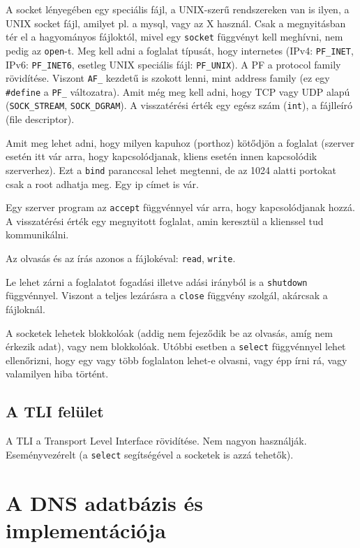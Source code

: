 \documentclass[fleqn,10pt,a4paper]{article}
\theoremstyle{magyar}
\begin{document}
  A socket lényegében egy speciális fájl, a UNIX-szerű rendszereken van is ilyen, a UNIX socket fájl, amilyet pl. a
  mysql, vagy az X használ. Csak a megnyitásban tér el a hagyományos fájloktól, mivel egy \texttt{socket} függvényt kell
  meghívni, nem pedig az \texttt{open}-t. Meg kell adni a foglalat típusát, hogy internetes (IPv4: \texttt{PF\_INET},
  IPv6: \texttt{PF\_INET6}, esetleg UNIX speciális fájl: \texttt{PF\_UNIX}). A PF a protocol family rövidítése. Viszont
  \texttt{AF\_} kezdetű is szokott lenni, mint address family (ez egy \texttt{\#define} a \texttt{PF\_} változatra). Amit
  még meg kell adni, hogy TCP vagy UDP alapú (\texttt{SOCK\_STREAM}, \texttt{SOCK\_DGRAM}). A visszatérési érték egy
  egész szám (\texttt{int}), a fájlleíró (file descriptor).
  
  Amit meg lehet adni, hogy milyen kapuhoz (porthoz) kötődjön a foglalat (szerver esetén itt vár arra, hogy
  kapcsolódjanak, kliens esetén innen kapcsolódik szerverhez). Ezt a \texttt{bind} paranccsal lehet megtenni, de az 1024
  alatti portokat csak a root adhatja meg. Egy ip címet is vár.

  Egy szerver program az \texttt{accept} függvénnyel vár arra, hogy kapcsolódjanak hozzá. A visszatérési érték egy
  megnyitott foglalat, amin keresztül a klienssel tud kommunikálni.
  
  Az olvasás és az írás azonos a fájlokéval: \texttt{read}, \texttt{write}.
  
  Le lehet zárni a foglalatot fogadási illetve adási irányból is a \texttt{shutdown} függvénnyel. Viszont a teljes
  lezárásra a \texttt{close} függvény szolgál, akárcsak a fájloknál.

  A socketek lehetek blokkolóak (addig nem fejeződik be az olvasás, amíg nem érkezik adat), vagy nem blokkolóak. Utóbbi
  esetben a \texttt{select} függvénnyel lehet ellenőrizni, hogy egy vagy több foglalaton lehet-e olvasni, vagy épp írni
  rá, vagy valamilyen hiba történt.
  
  \subsection{A TLI felület}
  A TLI a Transport Level Interface rövidítése. Nem nagyon használják. Eseményvezérelt (a \texttt{select} segítségével a
  socketek is azzá tehetők).

  
  \newpage  
  \section{A DNS adatbázis és implementációja}
\end{document}
